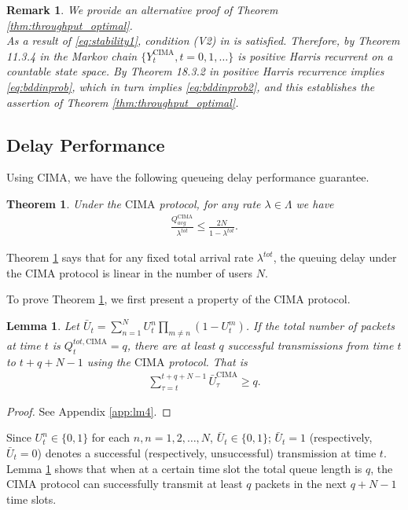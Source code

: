 \documentclass[onecolumn,draftcls]{IEEEtran}
\newtheorem{theorem}{Theorem}
\newtheorem{lemma}{Lemma}
\newtheorem{remark}{Remark}
\newcommand{\g}{\text{CIMA}}
\begin{document}
\begin{remark}
We provide an alternative proof of Theorem \ref{thm:throughput_optimal}.
\\
As a result of \eqref{eq:stability1}, condition (V2) in \cite[Chap. 11]{meyn2009markov} is satisfied.
Therefore, by Theorem 11.3.4 in \cite{meyn2009markov} the Markov chain $\{Y^{\g}_t, t=0,1,\dots\}$ is positive Harris recurrent on a countable state space. By Theorem 18.3.2 in \cite{meyn2009markov} positive Harris recurrence implies \eqref{eq:bddinprob}, which in turn implies \eqref{eq:bddinprob2}, and this establishes the assertion of Theorem \ref{thm:throughput_optimal}.

\end{remark}
\subsection{Delay Performance} \label{sub:delay}

Using $\g$, we have the following queueing delay performance guarantee.
\begin{theorem}
\label{thm:delay}
Under the $\g$ protocol, for any rate $\lambda \in \Lambda$ we have
\begin{align}
\frac{Q^{\g}_{avg}}{\lambda^{tot}} \leq \frac{2 N}{1-\lambda^{tot}}.
\label{eq:delaybound}
\end{align}
\end{theorem}

Theorem \ref{thm:delay} says that for any fixed total arrival rate $\lambda^{tot}$, the queuing delay under the $\g$ protocol is linear in the number of users $N$. 

To prove Theorem \ref{thm:delay}, we first present a property of the $\g$ protocol.
\begin{lemma}
\label{lm:successfulq}
Let $\bar{U}_t = \sum_{n=1}^N U^n_t\prod_{m\neq n}(1-U^m_t)$.
If the total number of packets at time $t$ is $Q^{tot,\g}_{t} = q$, there are at least $q$ successful transmissions from time $t$ to $t+q+N-1$ using the $\g$ protocol. That is
\begin{align*}
\sum_{\tau=t}^{t+q+N-1} \bar{U}^{\g}_{\tau} \geq q.
\end{align*}



\end{lemma}
\begin{proof}
See Appendix \ref{app:lm4}.
\end{proof}

Since $U^n_t\in\{0,1\}$ for each $n,n=1,2,\dots,N$, $\bar{U}_t\in \{0,1\}$; $\bar{U}_t=1$ (respectively, $\bar{U}_t=0$) denotes a successful (respectively, unsuccessful) transmission at time $t$.
Lemma \ref{lm:successfulq} shows that when at a certain time slot the total queue length is $q$,
the $\g$ protocol can successfully transmit at least $q$ packets in the next $q+N-1$ time slots.
\end{document}
